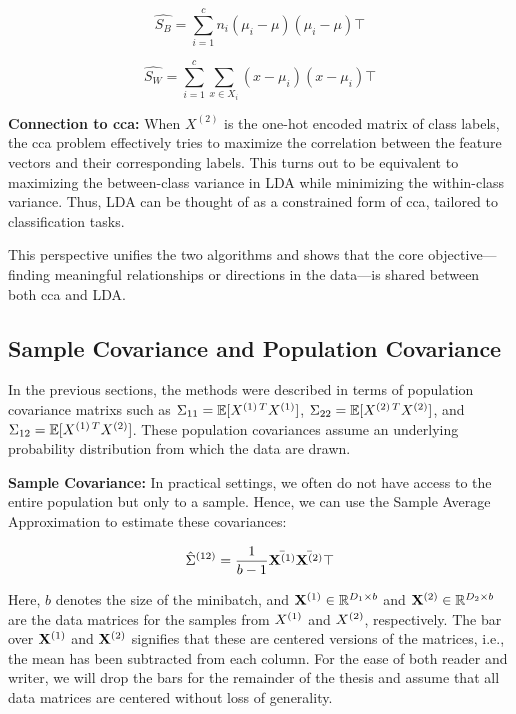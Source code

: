 \[
    \hat{S_B} = \sum_{i=1}^{c} n_i (\mu_i - \mu)(\mu_i - \mu)\top
\]

\[
    \hat{S_W} = \sum_{i=1}^{c} \sum_{x \in X_i} (x - \mu_i)(x - \mu_i)\top
\]

\textbf{Connection to \acrshort{cca}:} When \(X^{(2)}\) is the one-hot encoded matrix of class labels, the \acrshort{cca} problem effectively tries to maximize the correlation between the feature vectors and their corresponding labels.
This turns out to be equivalent to maximizing the between-class variance in LDA while minimizing the within-class variance.
Thus, LDA can be thought of as a constrained form of \acrshort{cca}, tailored to classification tasks.

This perspective unifies the two algorithms and shows that the core objective—finding meaningful relationships or directions in the data—is shared between both \acrshort{cca} and LDA.

\subsection{Sample Covariance and Population Covariance}
In the previous sections, the methods were described in terms of population  \glspl{covariance matrix} such as \(\Sigma_{11}=\mathbb{E}[X^{(1)\,T} X^{(1)}]\), \(\Sigma_{22}=\mathbb{E}[X^{(2)\,T} X^{(2)}]\), and \(\Sigma_{12}=\mathbb{E}[X^{(1)\,T} X^{(2)}]\).
These population covariances assume an underlying probability distribution from which the data are drawn.

\textbf{Sample Covariance:} In practical settings, we often do not have access to the entire population but only to a sample. Hence, we can use the Sample Average Approximation to estimate these covariances:

\[
    \hat{\Sigma}^{(12)} = \frac{1}{b-1} \bar{\mathbf{X}^{(1)}} \bar{\mathbf{X}^{(2)}}\top
\]

Here, \(b\) denotes the size of the minibatch, and \(\mathbf{X}^{(1)} \in \mathbb{R}^{D_1 \times b}\) and \(\mathbf{X}^{(2)} \in \mathbb{R}^{D_2 \times b}\) are the data matrices for the samples from \(X^{(1)}\) and \(X^{(2)}\), respectively. The bar over \(\mathbf{X}^{(1)}\) and \(\mathbf{X}^{(2)}\) signifies that these are centered versions of the matrices, i.e., the mean has been subtracted from each column.
For the ease of both reader and writer, we will drop the bars for the remainder of the thesis and assume that all data matrices are centered without loss of generality.

